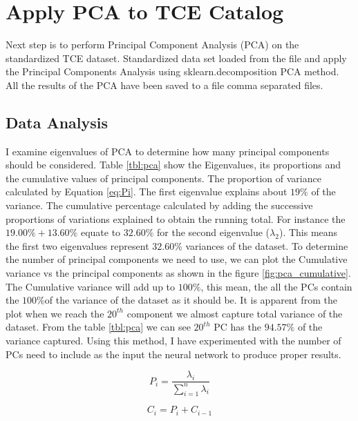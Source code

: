 \section{Apply PCA to TCE Catalog }
Next step is to perform Principal Component Analysis (PCA) on the standardized TCE dataset. Standardized data set loaded from the file and apply the Principal Components Analysis using sklearn.decomposition PCA method. All the results of the PCA have been saved to a file comma separated files.

\subsection{Data Analysis}
I examine eigenvalues of PCA to determine how many principal components should be considered. Table \ref{tbl:pca} show the Eigenvalues, its proportions and the cumulative values of principal components.  The proportion of variance calculated by Equation \ref{eq:Pi}. The first eigenvalue explains about $19\%$ of the variance. The cumulative percentage calculated by adding the successive proportions of variations explained to obtain the running total. For instance the $19.00\% + 13.60\%$ equate to $32.60\%$ for the second eigenvalue ($\lambda_2$). This means the first two eigenvalues represent $32.60\%$ variances of the dataset. To determine the number of principal components we need to use, we can plot the Cumulative variance vs the principal components as shown in the figure \ref{fig:pca_cumulative}. The Cumulative variance will add up to $100\%$, this mean, the all the PCs contain the $100\%$of the variance of the dataset as it should be. It is apparent from the plot when we reach the $20^{th}$ component we almost capture total variance of the dataset. From the table \ref{tbl:pca} we can see $20^{th}$ PC has the $94.57\%$ of the variance captured. Using this method, I have experimented with the number of PCs need to include as the input the neural network to produce proper results. 


\begin{equation}
P_i = \frac{\lambda_i}{\sum_{i=1}^{n} \lambda_i}
\label{eq:Pi}
\end{equation}

\begin{equation}
C_i = P_i  + C_{i-1}
\label{eq:Ci}
\end{equation}


